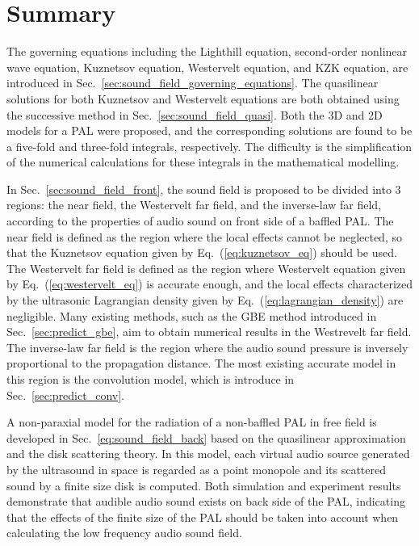 \section{Summary}
The governing equations including the Lighthill equation, second-order nonlinear wave equation, Kuznetsov equation, Westervelt equation, and KZK equation, are introduced in Sec.~\ref{sec:sound_field_governing_equations}.
The quasilinear solutions for both Kuznetsov and Westervelt equations are both obtained using the successive method in Sec.~\ref{sec:sound_field_quasi}.
Both the 3D and 2D models for a PAL were proposed, and the corresponding solutions are found to be a five-fold and three-fold integrals, respectively.
The difficulty is the simplification of the numerical calculations for these integrals in the mathematical modelling.

 In Sec.~\ref{sec:sound_field_front}, the sound field is proposed to be divided into 3 regions: the near field, the Westervelt far field, and the inverse-law far field, according to the properties of audio sound on front side of a baffled PAL.
 The near field is defined as the region where the local effects cannot be neglected, so that the Kuznetsov equation given by Eq.~(\ref{eq:kuznetsov_eq}) should be used.   
The Westervelt far field is defined as the region where Westervelt equation given by Eq.~(\ref{eq:westervelt_eq}) is accurate enough, and the local effects characterized by the ultrasonic Lagrangian density given by Eq.~(\ref{eq:lagrangian_density}) are negligible. 
Many existing methods, such as the GBE method introduced in Sec.~\ref{sec:predict_gbe}, aim to obtain numerical results in the Westrevelt far field.
The inverse-law far field is the region where the audio sound pressure is inversely proportional to the propagation distance. 
The most existing accurate model in this region is the convolution model, which is introduce in Sec.~\ref{sec:predict_conv}.

A non-paraxial model for the radiation of a non-baffled PAL in free field is developed in Sec.~\ref{eq:sound_field_back} based on the quasilinear approximation and the disk scattering theory. 
In this model, each virtual audio source generated by the ultrasound in space is regarded as a point monopole and its scattered sound by a finite size disk is computed. 
Both simulation and experiment results demonstrate that audible audio sound exists on back side of the PAL, indicating that the effects of the finite size of the PAL should be taken into account when calculating the low frequency audio sound field.
